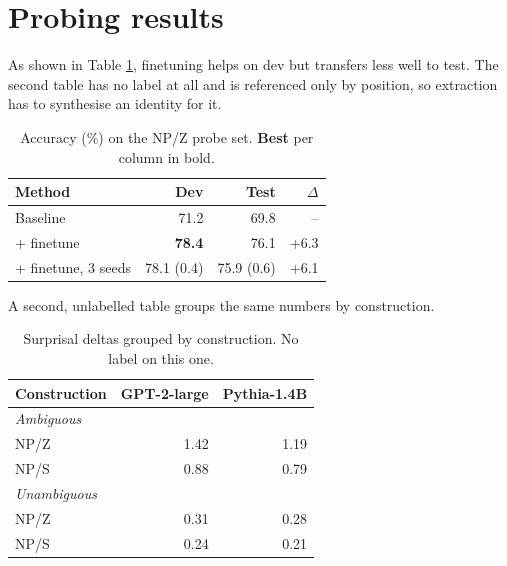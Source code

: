 \documentclass[11pt]{article}
\begin{document}
\section{Probing results}

As shown in Table \ref{tab:probe}, finetuning helps on dev but transfers less
well to test. The second table has no label at all and is referenced only by
position, so extraction has to synthesise an identity for it.

\begin{table}[htbp]
\caption{Accuracy (\%) on the \textsc{NP/Z} probe set. {\bf Best} per column in
bold.\label{tab:probe}}
\centering
\begin{tabular}{lrrr}
\hline
Method & Dev & Test & $\Delta$ \\
\hline
Baseline & 71.2 & 69.8 & -- \\
+ finetune & \textbf{78.4} & 76.1 & +6.3 \\
+ finetune, 3 seeds & 78.1 (0.4) & 75.9 (0.6) & +6.1 \\
\hline
\end{tabular}
\end{table}

A second, unlabelled table groups the same numbers by construction.

\begin{table}[htbp]
\centering
\begin{tabular}{lrr}
\hline
Construction & GPT-2-large & Pythia-1.4B \\
\hline
\multicolumn{3}{l}{\emph{Ambiguous}} \\
NP/Z & 1.42 & 1.19 \\
NP/S & 0.88 & 0.79 \\
\hline
\multicolumn{3}{l}{\emph{Unambiguous}} \\
NP/Z & 0.31 & 0.28 \\
NP/S & 0.24 & 0.21 \\
\hline
\end{tabular}
\caption{Surprisal deltas grouped by construction. No label on this one.}
\end{table}
\end{document}
